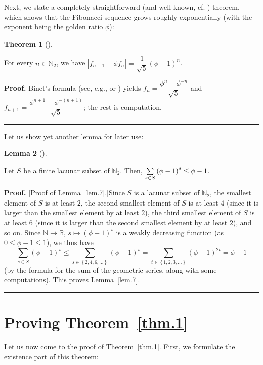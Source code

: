 \documentclass[numbers=enddot,12pt,final,onecolumn,notitlepage]{scrartcl}%
\numberwithin{exer}{section}
\theoremstyle{definition}
\newtheorem{theo}{Theorem}[section]
\newenvironment{theorem}[1][]
{\begin{theo}[#1]\begin{leftbar}}
{\end{leftbar}\end{theo}}
\newtheorem{lem}[theo]{Lemma}
\newenvironment{lemma}[1][]
{\begin{lem}[#1]\begin{leftbar}}
{\end{leftbar}\end{lem}}
\newenvironment{proof}[1][Proof]{\noindent\textbf{#1.} }{\ \rule{0.5em}{0.5em}}
\let\sumnonlimits\sum
\renewcommand{\sum}{\sumnonlimits\limits}
\begin{document}
Next, we state a completely straightforward (and well-known, cf. \cite[Chapter
9, Corollary 34]{BenQui03}) theorem, which shows that the Fibonacci sequence
grows roughly exponentially (with the exponent being the golden ratio $\phi$):

\begin{theorem}
\label{thm.6} For every $n\in\mathbb{N}_{2}$, we have $\left\vert f_{n+1}-\phi
f_{n}\right\vert =\dfrac{1}{\sqrt{5}}\left(  \phi-1\right)  ^{n}$.
\end{theorem}

\begin{proof}
Binet's formula (see, e.g., \cite[Identity 240]{BenQui03} or \cite[(1.20)]%
{Vorobi02}) yields $f_{n}=\dfrac{\phi^{n}-\phi^{-n}}{\sqrt{5}}$ and
$f_{n+1}=\dfrac{\phi^{n+1}-\phi^{-\left(  n+1\right)  }}{\sqrt{5}}$; the rest
is computation.
\end{proof}

Let us show yet another lemma for later use:

\begin{lemma}
\label{lem.7} Let $S$ be a finite lacunar subset of $\mathbb{N}_{2}$. Then,
$\sum\limits_{s\in S}\left(  \phi-1\right)  ^{s}\leq\phi-1$.
\end{lemma}

\begin{proof}
[Proof of Lemma~\ref{lem.7}.]Since $S$ is a lacunar subset of $\mathbb{N}_{2}%
$, the smallest element of $S$ is at least $2$, the second smallest element of
$S$ is at least $4$ (since it is larger than the smallest element by at least
$2$), the third smallest element of $S$ is at least $6$ (since it is larger
than the second smallest element by at least $2$), and so on. Since
$\mathbb{N}\rightarrow\mathbb{R}$, $s\mapsto\left(  \phi-1\right)  ^{s}$ is a
weakly decreasing function (as $0\leq\phi-1\leq1$), we thus have%
\[
\sum_{s\in S}\left(  \phi-1\right)  ^{s}\leq\sum_{s\in\left\{  2,4,6,\ldots
\right\}  }\left(  \phi-1\right)  ^{s}=\sum_{t\in\left\{  1,2,3,\ldots
\right\}  }\left(  \phi-1\right)  ^{2t}=\phi-1
\]
(by the formula for the sum of the geometric series, along with some
computations). This proves Lemma~\ref{lem.7}.
\end{proof}

\section{Proving Theorem~\ref{thm.1}}

Let us now come to the proof of Theorem~\ref{thm.1}. First, we formulate the
existence part of this theorem:
\end{document}
